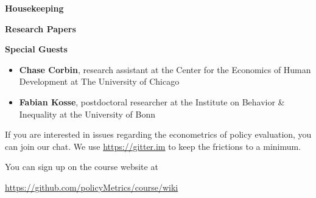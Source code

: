 \begin{frame}\begin{center}
\LARGE\textbf{Housekeeping}
\end{center}\end{frame}
\begin{frame}\textbf{Research Papers}

\begin{itemize}\setlength\itemsep{0.5em}
\item {}
{\scriptsize\item {}
\item {}}
\end{itemize}

\end{frame}
\begin{frame}\textbf{Special Guests}

\begin{itemize}\setlength\itemsep{0.5em}
\item \textbf{Chase Corbin}, research assistant at the Center for the Economics of Human Development at The University of Chicago
\item \textbf{Fabian Kosse}, postdoctoral researcher at the Institute on Behavior \& Inequality at the University of Bonn
\end{itemize}
\end{frame}
\begin{frame}
If you are interested in issues regarding the econometrics of policy evaluation, you can join our chat. We use \href{gitter.im}{https://gitter.im} to keep the frictions to a minimum.\\\vspace{0.3cm}

You can sign up on the course website at

\begin{center}
\url{https://github.com/policyMetrics/course/wiki}
\end{center}
\end{frame}
